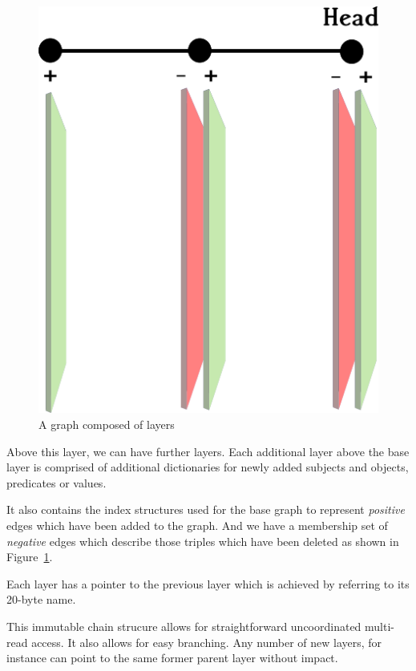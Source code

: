 \documentclass[10pt, a4paper, twocolumn]{article} %
\begin{document}
\begin{figure}
	\includegraphics[width=\linewidth]{layers-diagram.png} %
	\caption{A graph composed of layers} %
	\label{fig:layers} %
\end{figure}

Above this layer, we can have further layers. Each additional layer
above the base layer is comprised of additional dictionaries for newly
added subjects and objects, predicates or values.

It also contains the index structures used for the base graph to
represent {\em positive} edges which have been added to the graph. And
we have a membership set of {\em negative} edges which describe those
triples which have been deleted as shown in Figure~\ref{fig:layers}.

Each layer has a pointer to the previous layer which is achieved by
referring to its 20-byte name.

This immutable chain strucure allows for straightforward uncoordinated
multi-read access.  It also allows for easy branching. Any number of
new layers, for instance can point to the same former parent layer
without impact.
\end{document}
